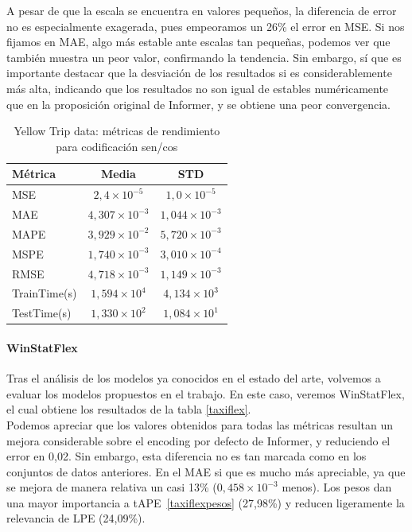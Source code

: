 A pesar de que la escala se encuentra en valores pequeños, la diferencia de error no es especialmente exagerada, pues empeoramos un 26\% el error en MSE. Si nos fijamos en MAE, algo más estable ante escalas tan pequeñas, podemos ver que también muestra un peor valor, confirmando la tendencia. Sin embargo, sí que es importante destacar que la desviación de los resultados si es considerablemente más alta, indicando que los resultados no son igual de estables numéricamente que en la proposición original de Informer, y se obtiene una peor convergencia.\\

\begin{table}[!ht]
	\centering
	\begin{tabular}{l|c|c}
		\toprule
		Métrica & Media & STD \\
		\midrule
		MSE & $2,4 \times 10^{-5}$ & $1,0 \times 10^{-5}$ \\
		MAE & $4,307 \times 10^{-3}$ & $1,044 \times 10^{-3}$ \\
		MAPE & $3,929 \times 10^{-2}$ & $5,720 \times 10^{-3}$ \\
		MSPE & $1,740 \times 10^{-3}$ & $3,010 \times 10^{-4}$ \\
		RMSE & $4,718 \times 10^{-3}$ & $1,149 \times 10^{-3}$ \\
		TrainTime(s) & $1,594 \times 10^{4}$ & $4,134 \times 10^{3}$ \\
		TestTime(s) & $1,330 \times 10^{2}$ & $1,084 \times 10^{1}$ \\
		\bottomrule
	\end{tabular}
	\caption{Yellow Trip data: métricas de rendimiento para codificación sen/cos}
	\label{taxipe}
\end{table}

\paragraph{WinStatFlex}

Tras el análisis de los modelos ya conocidos en el estado del arte, volvemos a evaluar los modelos propuestos en el trabajo. En este caso, veremos WinStatFlex, el cual obtiene los resultados de la tabla \ref{taxiflex}.\\

Podemos apreciar que los valores obtenidos para todas las métricas resultan un mejora considerable sobre el encoding por defecto de Informer, y reduciendo el error en 0,02. Sin embargo, esta diferencia no es tan marcada como en los conjuntos de datos anteriores. En el MAE si que es mucho más apreciable, ya que se mejora de manera relativa un casi 13\% ($0,458 \times 10^{-3}$ menos). Los pesos dan una mayor importancia a tAPE~\ref{taxiflexpesos} (27,98\%) y reducen ligeramente la relevancia de LPE (24,09\%).\\ 



